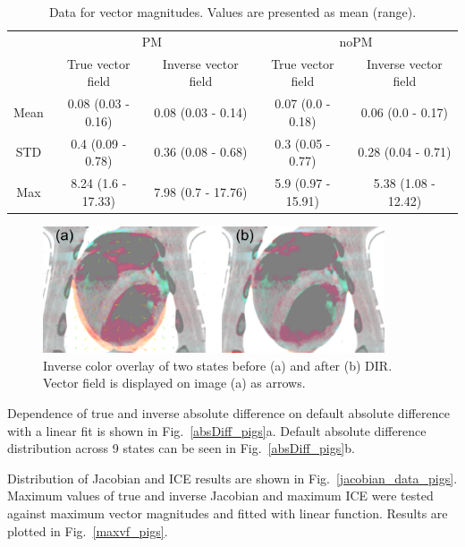 \begin{table}[H]
  \centering
  \caption{Data for vector magnitudes. Values are presented as mean (range).}
  \begin{tabular}{c|c|c|c|c}
	    & \multicolumn{2}{|c|}{PM} & \multicolumn{2}{|c}{noPM} \\
  
            & True vector field   & Inverse vector field   & True vector field  & Inverse vector field \\
       \hline
	Mean & 0.08 (0.03 - 0.16) & 0.08 (0.03 - 0.14) & 0.07 (0.0 - 0.18)  & 0.06 (0.0 - 0.17) \\ 
	STD  & 0.4 (0.09 - 0.78)  & 0.36 (0.08 - 0.68) & 0.3 (0.05 - 0.77)  & 0.28 (0.04 - 0.71) \\ 
	Max  & 8.24 (1.6 - 17.33) & 7.98 (0.7 - 17.76) & 5.9 (0.97 - 15.91) & 5.38 (1.08 - 12.42) \\ 
    \hline\hline
  \end{tabular}
  \label{tab:vectordata_pig}
\end{table}

\begin{figure}[H]
	\begin{center}		
		\includegraphics[width=0.9\textwidth]{./Vmm/Images/exampleReg_pigs.png}
		\caption{Inverse color overlay of two states before (a) and after (b) DIR. Vector field is displayed on image (a) as arrows.}
		\label{exampleReg_pigs}
	\end{center}
\end{figure}

Dependence of true and inverse absolute difference on default absolute difference with a linear fit is shown in Fig.~\ref{absDiff_pigs}a. 
Default absolute difference distribution across 9 states can be seen in Fig.~\ref{absDiff_pigs}b.

Distribution of Jacobian and ICE results are shown in Fig.~\ref{jacobian_data_pigs}. Maximum values of true and inverse Jacobian and maximum ICE were
tested against maximum vector magnitudes and fitted with linear function. Results are plotted in Fig.~\ref{maxvf_pigs}.

